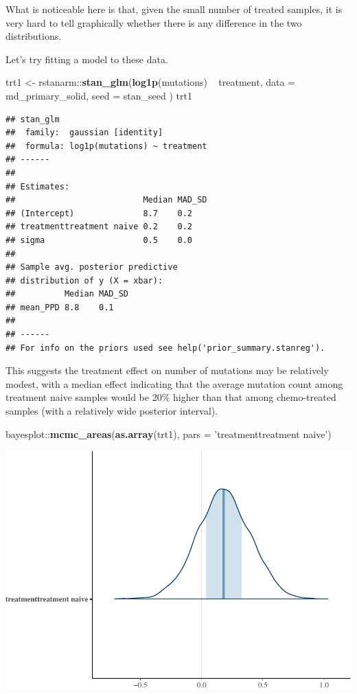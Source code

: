 \documentclass[]{article}
\newenvironment{Shaded}{\begin{snugshade}}{\end{snugshade}}
\newcommand{\KeywordTok}[1]{\textcolor[rgb]{0.13,0.29,0.53}{\textbf{{#1}}}}
\newcommand{\DataTypeTok}[1]{\textcolor[rgb]{0.13,0.29,0.53}{{#1}}}
\newcommand{\StringTok}[1]{\textcolor[rgb]{0.31,0.60,0.02}{{#1}}}
\newcommand{\NormalTok}[1]{{#1}}
\begin{document}
What is noticeable here is that, given the small number of treated
samples, it is very hard to tell graphically whether there is any
difference in the two distributions.

Let's try fitting a model to these data.

\begin{Shaded}
\begin{Highlighting}[]
\NormalTok{trt1 <-}\StringTok{ }\NormalTok{rstanarm::}\KeywordTok{stan_glm}\NormalTok{(}\KeywordTok{log1p}\NormalTok{(mutations) ~}\StringTok{ }\NormalTok{treatment,}
                           \DataTypeTok{data =} \NormalTok{md_primary_solid,}
                           \DataTypeTok{seed =} \NormalTok{stan_seed}
                           \NormalTok{)}
\NormalTok{trt1}
\end{Highlighting}
\end{Shaded}

\begin{verbatim}
## stan_glm
##  family:  gaussian [identity]
##  formula: log1p(mutations) ~ treatment
## ------
## 
## Estimates:
##                          Median MAD_SD
## (Intercept)              8.7    0.2   
## treatmenttreatment naive 0.2    0.2   
## sigma                    0.5    0.0   
## 
## Sample avg. posterior predictive 
## distribution of y (X = xbar):
##          Median MAD_SD
## mean_PPD 8.8    0.1   
## 
## ------
## For info on the priors used see help('prior_summary.stanreg').
\end{verbatim}

This suggests the treatment effect on number of mutations may be
relatively modest, with a median effect indicating that the average
mutation count among treatment naive samples would be 20\% higher than
that among chemo-treated samples (with a relatively wide posterior
interval).

\begin{Shaded}
\begin{Highlighting}[]
\NormalTok{bayesplot::}\KeywordTok{mcmc_areas}\NormalTok{(}\KeywordTok{as.array}\NormalTok{(trt1), }\DataTypeTok{pars =} \StringTok{'treatmenttreatment naive'}\NormalTok{)}
\end{Highlighting}
\end{Shaded}

\includegraphics{Hierarchical_model_mutations_and_peptides_files/figure-latex/psolid-trt1-coef-plot-1.pdf}
\end{document}
